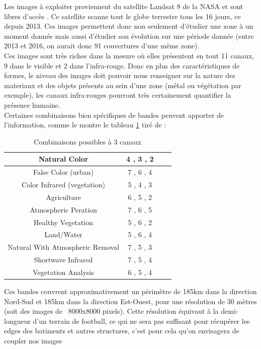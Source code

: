 \documentclass{book}
\begin{document}
Les images à exploiter proviennent du satellite Landsat 8 de la NASA et sont libres d'accès \cite{landsat8}. Ce satellite scanne tout le globe terrestre 
tous les 16 jours, ce depuis 2013. Ces images permettent donc non seulement d'étudier une zone à un moment donnée mais aussi d'étudier son évolution sur
une période donnée (entre 2013 et 2016, on aurait donc 91 couvertures d'une même zone).\\
Ces images sont très riches dans la mesure où elles présentent en tout 11 canaux, 9 dans le visible et 2 dans l'infra-rouge. Donc en plus des caractéristiques de formes, le niveau des images doit pouvoir nous renseigner sur 
la nature des materiaux et des objets présents au sein d'une zone (métal ou végétation par exemple), les canaux infra-rouges pourront très certainement
quantifier la présence humaine.\\
Certaines combinaisons bien spécifiques de bandes peuvent apporter de l'information, comme le montre le tableau \ref{combinaison}
tiré de \cite{esri}:
\begin{table}
\begin{center}
\begin{tabular}{|c|c|c|c|}
\hline
Natural Color & 4 , 3 , 2\\
\hline
False Color (urban) & 7 , 6 , 4\\
\hline
Color Infrared (vegetation) & 5 , 4 , 3\\
\hline
Agriculture & 6 , 5 , 2\\
\hline
Atmospheric Peration & 7 , 6 , 5\\
\hline
Healthy Vegetation & 5 , 6 , 2\\
\hline
Land/Water & 5 , 6 , 4\\
\hline
Natural With Atmospheric Removal & 7 , 5 , 3\\
\hline
Shortwave Infrared & 7 , 5 , 4\\
\hline
Vegetation Analysis & 6 , 5 , 4\\
\hline
\end{tabular}
\end{center}
\caption{Combinaisons possibles à 3 canaux}
\label{combinaison}
\end{table}
\clearpage
Ces bandes couvrent approximativement un périmètre de 185km dans la direction Nord-Sud et 185km
dans la direction Est-Ouest, pour une résolution de 30 mètres (soit des images de ~8000x8000 pixels). Cette
résolution équivaut à la demi-longueur d'un terrain de football, ce qui ne sera pas
suffisant pour récupérer les edges des batiments et autres structures, c'est pour cela qu'on envisagera de coupler nos images
\end{document}

